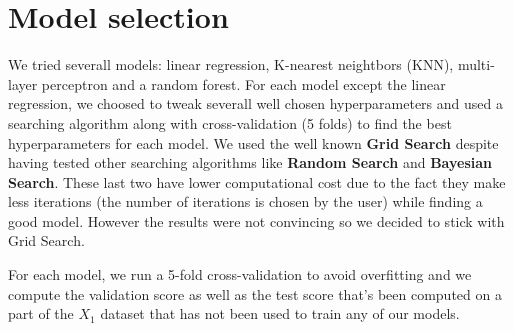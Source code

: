 \section{Model selection}

We tried severall models: linear regression, K-nearest neightbors (KNN), multi-layer perceptron and a random forest. For each model except the linear regression, we choosed to tweak severall well chosen hyperparameters and used a searching algorithm along with cross-validation (5 folds) to find the best hyperparameters for each model. We used the well known \textbf{Grid Search} despite having tested other searching algorithms like \textbf{Random Search} and \textbf{Bayesian Search}. These last two have lower computational cost due to the fact they make less iterations (the number of iterations is chosen by the user) while finding a good model. However the results were not convincing so we decided to stick with Grid Search. 

For each model, we run a 5-fold cross-validation to avoid overfitting and we compute the validation score as well as the test score that's been computed on a part of the $X_1$ dataset that has not been used to train any of our models.



